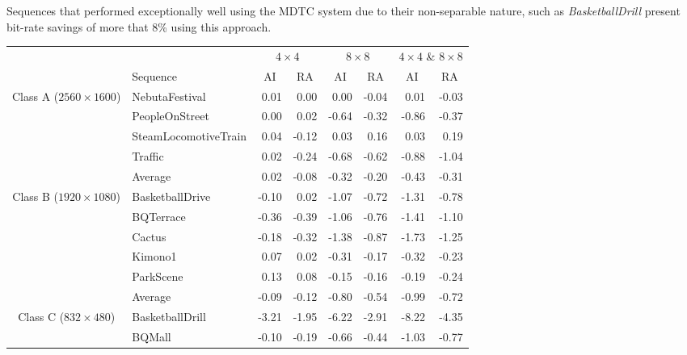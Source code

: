 \documentclass[11pt,a4paper,openright,twoside]{book}
\numberwithin{equation}{section} %
\numberwithin{figure}{section} %
\numberwithin{table}{section} %
\begin{document}
Sequences that performed exceptionally well using the \ac{MDTC} system due to
their non-separable nature, such as \emph{BasketballDrill} present bit-rate
savings of more that 8\% using this approach.

\begin{table}[tb]
	\centering
	\small
	\begin{tabularx}{\textwidth}{c|X|rr|rr|rr}
		\multicolumn{2}{c}{} &
		\multicolumn{2}{c|}{$4\times4$} &
		\multicolumn{2}{c|}{$8\times8$} &
		\multicolumn{2}{c}{$4\times4$ \& $8\times8$} \\
		\cline{2-8}
		\multicolumn{1}{c}{} & {Sequence} &
		\multicolumn{1}{c}{ \acs{AI}} & \multicolumn{1}{c|}{ \acs{RA}} &
		\multicolumn{1}{c}{ \acs{AI}} & \multicolumn{1}{c|}{ \acs{RA}} &
		\multicolumn{1}{c}{ \acs{AI}} & \multicolumn{1}{c}{ \acs{RA}} \\
		\hline
		\hline
		\multirow{5}{2cm}{\centering Class A ($2560\times1600$)}
		& NebutaFestival         &  0.01 &  0.00 &  0.00 & -0.04 &  0.01 & -0.03 \\
		& PeopleOnStreet         &  0.00 &  0.02 & -0.64 & -0.32 & -0.86 & -0.37 \\
		& SteamLocomotiveTrain   &  0.04 & -0.12 &  0.03 &  0.16 &  0.03 &  0.19 \\
		& Traffic                &  0.02 & -0.24 & -0.68 & -0.62 & -0.88 & -1.04 \\
		\cline{2-8} &
		Average                  &  0.02 & -0.08 & -0.32 & -0.20 & -0.43 & -0.31 \\
		\hline
		\hline
		\multirow{6}{2cm}{\centering Class B ($1920\times1080$)}
		& BasketballDrive        & -0.10 &  0.02 & -1.07 & -0.72 & -1.31 & -0.78 \\
		& BQTerrace              & -0.36 & -0.39 & -1.06 & -0.76 & -1.41 & -1.10 \\
		& Cactus                 & -0.18 & -0.32 & -1.38 & -0.87 & -1.73 & -1.25 \\
		& Kimono1                &  0.07 &  0.02 & -0.31 & -0.17 & -0.32 & -0.23 \\
		& ParkScene              &  0.13 &  0.08 & -0.15 & -0.16 & -0.19 & -0.24 \\
		\cline{2-8} &
		Average                  & -0.09 & -0.12 & -0.80 & -0.54 & -0.99 & -0.72 \\
		\hline
		\hline
		\multirow{5}{2cm}{\centering Class C ($832\times480$)}
		& BasketballDrill        & -3.21 & -1.95 & -6.22 & -2.91 & -8.22 & -4.35 \\
		& BQMall                 & -0.10 & -0.19 & -0.66 & -0.44 & -1.03 & -0.77 \\

\end{tabularx}
\end{table}
\end{document}
